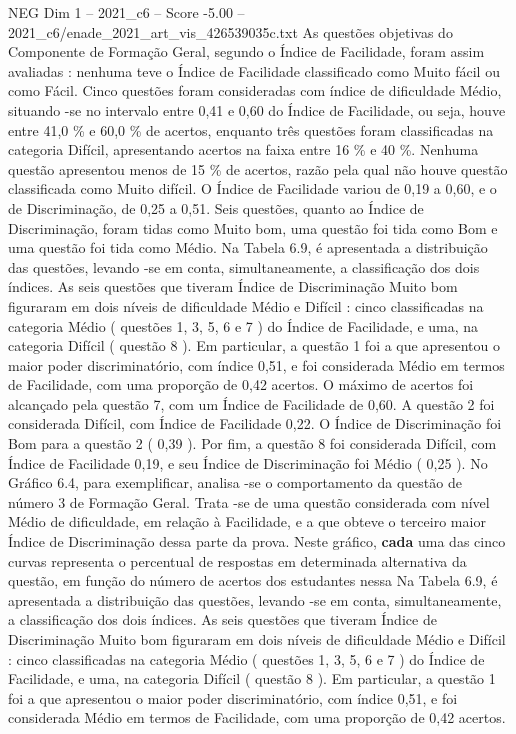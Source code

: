 \begin{textsample}{NEG Dim 1 – 2021\_c6 – Score -5.00 – 2021\_c6/enade\_2021\_art\_vis\_426539035c.txt}
As questões objetivas do Componente de Formação Geral, segundo o Índice de Facilidade, foram assim avaliadas : nenhuma teve o Índice de Facilidade classificado como Muito fácil ou como Fácil.
Cinco questões foram consideradas com índice de dificuldade Médio, situando -se no intervalo entre 0,41 e 0,60 do Índice de Facilidade, ou seja, houve entre 41,0 \% e 60,0 \% de acertos, enquanto três questões foram classificadas na categoria Difícil, apresentando acertos na faixa entre 16 \% e 40 \%.
Nenhuma questão apresentou menos de 15 \% de acertos, razão pela qual não houve questão classificada como Muito difícil.
O Índice de Facilidade variou de 0,19 a 0,60, e o de Discriminação, de 0,25 a 0,51.
Seis questões, quanto ao Índice de Discriminação, foram tidas como Muito bom, uma questão foi tida como Bom e uma questão foi tida como Médio.
Na Tabela 6.9, é apresentada a distribuição das questões, levando -se em conta, simultaneamente, a classificação dos dois índices.
As seis questões que tiveram Índice de Discriminação Muito bom figuraram em dois níveis de dificuldade Médio e Difícil : cinco classificadas na categoria Médio ( questões 1, 3, 5, 6 e 7 ) do Índice de Facilidade, e uma, na categoria Difícil ( questão 8 ).
Em particular, a questão 1 foi a que apresentou o maior poder discriminatório, com índice 0,51, e foi considerada Médio em termos de Facilidade, com uma proporção de 0,42 acertos.
O máximo de acertos foi alcançado pela questão 7, com um Índice de Facilidade de 0,60.
A questão 2 foi considerada Difícil, com Índice de Facilidade 0,22.
O Índice de Discriminação foi Bom para a questão 2 ( 0,39 ).
Por fim, a questão 8 foi considerada Difícil, com Índice de Facilidade 0,19, e seu Índice de Discriminação foi Médio ( 0,25 ).
No Gráfico 6.4, para exemplificar, analisa -se o comportamento da questão de número 3 de Formação Geral.
Trata -se de uma questão considerada com nível Médio de dificuldade, em relação à Facilidade, e a que obteve o terceiro maior Índice de Discriminação dessa parte da prova.
Neste gráfico, \textbf{cada} uma das cinco curvas representa o percentual de respostas em determinada alternativa da questão, em função do número de acertos dos estudantes nessa Na Tabela 6.9, é apresentada a distribuição das questões, levando -se em conta, simultaneamente, a classificação dos dois índices.
As seis questões que tiveram Índice de Discriminação Muito bom figuraram em dois níveis de dificuldade Médio e Difícil : cinco classificadas na categoria Médio ( questões 1, 3, 5, 6 e 7 ) do Índice de Facilidade, e uma, na categoria Difícil ( questão 8 ).
Em particular, a questão 1 foi a que apresentou o maior poder discriminatório, com índice 0,51, e foi considerada Médio em termos de Facilidade, com uma proporção de 0,42 acertos.

\end{textsample}
